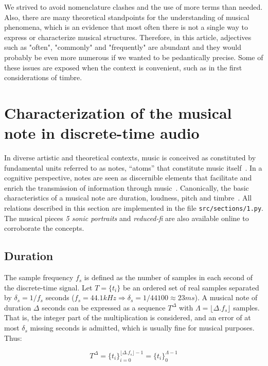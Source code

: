 We strived to avoid nomenclature clashes and the use of more terms than needed.
Also, there are many theoretical standpoints for the understanding of musical phenomena,
which is an evidence that most often there is not a single way to express or characterize musical structures.
Therefore, in this article, adjectives such as "often", "commonly" and "frequently" are abundant and they would probably be even more numerous if we wanted to be pedantically precise.
Some of these issues are exposed when the context is convenient, such as in the first considerations of timbre.

\section{Characterization of the musical note in discrete-time audio} \label{sec:discNote}\label{sec:notaDisc}
In diverse artistic and theoretical contexts, music is conceived as constituted by fundamental units referred to as notes, ``atoms'' that constitute music itself~\cite{Wisnick, Lovelock, Webern}.
In a cognitive perspective, notes are seen as discernible elements that facilitate and enrich the transmission of information through music~\cite{Roederer, Lacerda}.
Canonically, the basic characteristics of a musical note are duration, loudness, pitch and timbre~\cite{Lacerda}.
All relations described in this section are implemented in the file \texttt{src/sections/1.py}.
The musical pieces \emph{5 sonic portraits} and \emph{reduced-fi} are also available online to corroborate the concepts.

\subsection{Duration}
The sample frequency $f_s$ is defined as the number of samples in each second of the discrete-time signal. Let $T=\{t_i\}$ be an ordered set of real samples separated by $\delta_s=1/f_s$ seconds ($f_s=44.1kHz \Rightarrow \delta_s=1/44100\approx 23ms$).
A musical note of duration $\Delta$ seconds can be expressed as a sequence $T^{\Delta}$ with $\Lambda = \lfloor \Delta . f_s \rfloor$ samples.
That is, the integer part of the multiplication is considered, and an error of at most $\delta_s$ missing seconds is admitted, which is usually fine for musical purposes. Thus:


\begin{equation}\label{eq:dur}
T^{\Delta}={\{t_i\}}_{i=0}^{\lfloor \Delta . f_s \rfloor -1} = \{t_i\}_0^{\Lambda-1}
\end{equation}

